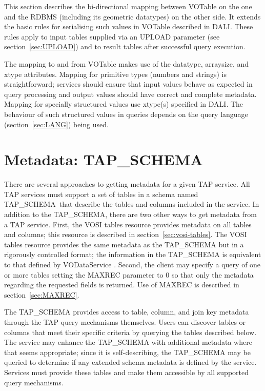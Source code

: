 \documentclass[11pt,letter]{ivoa}
\newcommand{\tapschema}{TAP\_SCHE\-MA}
\newcommand{\tapschema}{\mbox{%
  \relsize{-0.5}TAP\discretionary{-}{}{\kern-2pt\_}SCHEMA}}
\begin{document}
This section describes the bi-directional mapping between VOTable on the
one and the RDBMS (including its 
geometric datatypes) on the other side.  It extends the basic rules for serialising such values in 
VOTable described in DALI. These rules apply to input tables 
supplied via an UPLOAD parameter (see section~\ref{sec:UPLOAD}) and to result tables after successful 
query execution.

The mapping to and from VOTable makes use of the datatype, arraysize, and xtype 
attributes. Mapping for primitive types (numbers and strings) is 
straightforward; services should ensure that input values behave as 
expected in query processing and output values should have correct and complete 
metadata. Mapping for specially structured values use xtype(s) specified
in DALI. The behaviour of such structured values in queries depends 
on the query language (section~\ref{sec:LANG}) being used. 

\section{Metadata: TAP\kern-3pt\_SCHEMA}
\label{sec:tap-schema}

There are several approaches to getting metadata for a given TAP service. All 
TAP services must support a set of tables in a schema named 
\tapschema\ that describe the tables and columns included in the 
service. In addition to the \tapschema, there are two other ways 
to get metadata from a TAP service. First, the VOSI tables resource provides 
metadata on all tables and columns; this resource is described in 
section~\ref{sec:vosi-tables}. The 
VOSI tables resource provides the same metadata as the \tapschema{}
but in a rigorously controlled format; the information in the 
\tapschema{} is equivalent to that defined by VODataService 
\citep{2010ivoa.spec.1202P}. Second, the client may specify a query of one or more 
tables setting the 
MAXREC parameter to 0 so that only the metadata regarding the requested fields 
is returned. Use of MAXREC is described in section~\ref{sec:MAXREC}.

The \tapschema{} provides access to table, column, and join key 
metadata through the TAP query mechanisms themselves. Users can discover tables 
or columns that meet their specific criteria by querying the tables described 
below.  The service may enhance the \tapschema{} with additional 
metadata where that seems appropriate; since it is self-describing, the 
\tapschema{} may be queried to determine if any extended schema 
metadata is defined by the service. Services must provide these tables and make 
them accessible by all supported query mechanisms.
\end{document}
